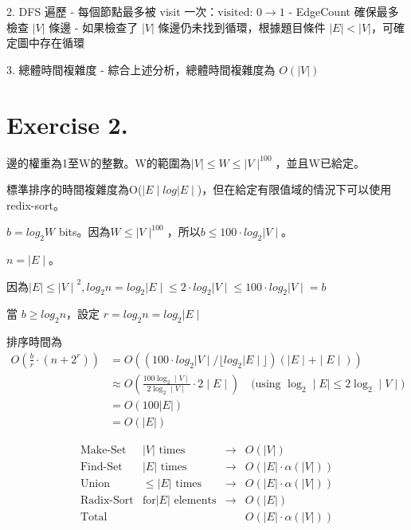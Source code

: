 \documentclass[UTF8, a4paper, 11pt]{report}
\begin{document}
2. DFS 遍歷
- 每個節點最多被 visit 一次：\(\text{visited: } 0 \rightarrow 1\)
- EdgeCount 確保最多檢查 \(|V|\) 條邊
- 如果檢查了 \(|V|\) 條邊仍未找到循環，根據題目條件 \(|E| < |V|\)，可確定圖中存在循環

3. 總體時間複雜度
- 綜合上述分析，總體時間複雜度為 \(O(|V|)\)

\pagebreak

\section*{Exercise 2.}

邊的權重為1至W的整數。W的範圍為$\mid V\mid \le W \le \mid V\mid^{100}$，並且W已給定。

標準排序的時間複雜度為O($\mid E\mid log{\mid E\mid}$)，但在給定有限值域的情況下可以使用redix-sort。

$b = log_2{W}$ bits。因為$W\le \mid V\mid^{100}$，所以$b\le 100\cdot log_2{\mid V\mid}$。

$n = \mid E\mid$。

因為$\mid E\mid \le {\mid V\mid}^2, log_2{n} = log_2{\mid E\mid} \le 2\cdot log_2{\mid V\mid} \le 100\cdot log_2{\mid V\mid} = b$

當 $b \ge log_2{n}$，設定 $r = log_2{n} = log_2{\mid E\mid}$

排序時間為
\begin{align*}
    O\left(\frac{b}{r}\cdot (n + 2^r)\right) & = O\left((100\cdot log_2{\mid V\mid} / \lfloor log_2{\mid E\mid}\rfloor)(\mid E\mid + \mid E\mid)\right)                                                   \\
                                             & \approx O\left(\frac{100\log_2\mid V\mid }{2\log_2\mid V\mid } \cdot 2 \mid E\mid \right) \quad \text{(using $\log_2\mid E\mid  \leq 2\log_2\mid V\mid $)} \\
                                             & = O(100|E|)                                                                                                                                                \\
                                             & = O(|E|)
\end{align*}

\begin{equation}
    \begin{array}{lccc}
        \text{Make-Set}   & |V| \text{ times}               & \rightarrow & O(|V|)                   \\
        \text{Find-Set}   & |E| \text{ times}               & \rightarrow & O(|E| \cdot \alpha(|V|)) \\
        \text{Union}      & \leq |E| \text{ times}          & \rightarrow & O(|E| \cdot \alpha(|V|)) \\
        \text{Radix-Sort} & \text{for} |E| \text{ elements} & \rightarrow & O(|E|)                   \\
        \text{Total}      &                                 &             & O(|E| \cdot \alpha(|V|))
    \end{array}
\end{equation}
\end{document}

